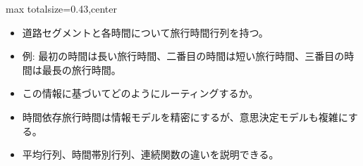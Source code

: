 \clearpage
{}
\begin{minipage}[t]{0.405\textwidth}
\begin{adjustbox}{max totalsize={\textwidth}{0.43\textheight},center}
\begin{minipage}{\textwidth}\scriptsize
{}\begin{itemize}
\item 道路セグメントと各時間について旅行時間行列を持つ。
\item 例: 最初の時間は長い旅行時間、二番目の時間は短い旅行時間、三番目の時間は最長の旅行時間。
\item この情報に基づいてどのようにルーティングするか。
\end{itemize}\begin{itemize}
\item 時間依存旅行時間は情報モデルを精密にするが、意思決定モデルも複雑にする。
\item 平均行列、時間帯別行列、連続関数の違いを説明できる。
\end{itemize}
\end{minipage}
\end{adjustbox}
\end{minipage}\hfill
